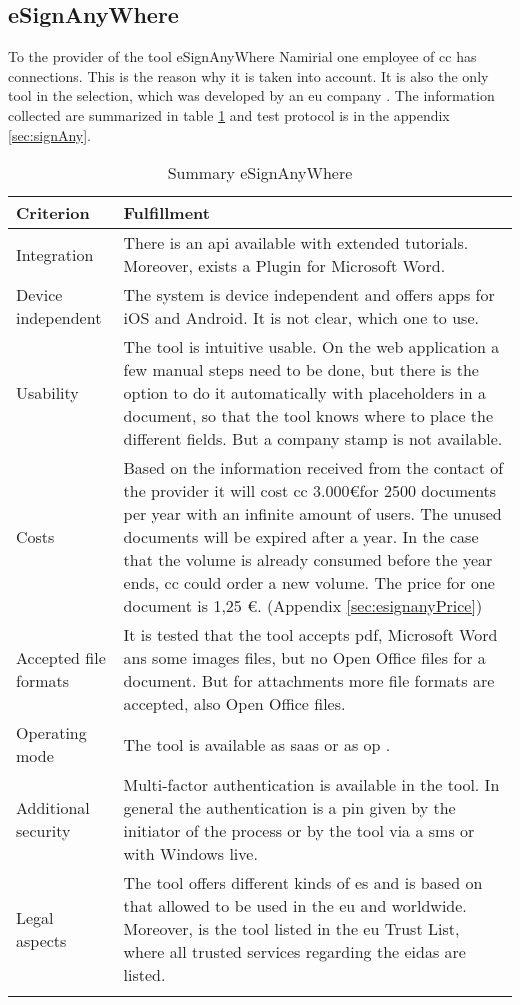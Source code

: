 \subsection{eSignAnyWhere}
To the provider of the tool eSignAnyWhere Namirial one employee of \gls{cc} has connections. This is the reason why it is taken into account. It is also the only tool in the selection, which was developed by an \gls{eu} company \parencite{signAny2018contact}. The information collected are summarized in table \ref{tab:esignany} and test protocol is in the appendix \ref{sec:signAny}. \newpage
	\begin{longtable}{|p{4cm}|p{10cm}|} \hline
		Criterion & Fulfillment \\ \hline
		Integration & There is an \gls{api} available with extended tutorials. Moreover, exists a Plugin for Microsoft Word. \parencite{signAny2018api, signAny2018dev,signAny2018guide} \\ \hline
		Device independent & The system is device independent and offers \glspl{app} for iOS and Android. It is not clear, which one to use. \parencite{signAny2018info} \\ \hline
		Usability & The tool is intuitive usable. On the web application a few manual steps need to be done, but there is the option to do it automatically with placeholders in a document, so that the tool knows where to place the different fields. But a company stamp is not available. \parencite{signAny2018guide} \\ \hline
		Costs & Based on the information received from the contact of the provider it will cost \gls{cc} 3.000\euro for 2500 documents per year with an infinite amount of users. The unused documents will be expired after a year. In the case that the volume is already consumed before the year ends, \gls{cc} could order a new volume. The price for one document is 1,25 \euro. (Appendix \ref{sec:esignanyPrice}) \\ \hline
		Accepted file formats & It is tested that the tool accepts \gls{pdf}, Microsoft Word ans some images files, but no Open Office files for a document. But for attachments more file formats are accepted, also Open Office files. \\ \hline
		Operating mode &  The tool is available as \gls{saas} or as \gls{op} \parencite{signAny2018business}. \\ \hline
		Additional security & Multi-factor authentication is available in the tool. In general the authentication is a pin given by the initiator of the process or by the tool via a \gls{sms} or with Windows live. \parencite{signAny2018sign} \\ \hline
		Legal aspects & The tool offers different kinds of \gls{es} and is based on that allowed to be used in the \gls{eu} and worldwide. Moreover, is the tool listed in the \gls{eu} Trust List, where all trusted services regarding the \gls{eidas} are listed. \parencite{signAny2018sign,signAny2018trust} \\ \hline
	\caption{Summary eSignAnyWhere}
	\label{tab:esignany}
	\end{longtable}
